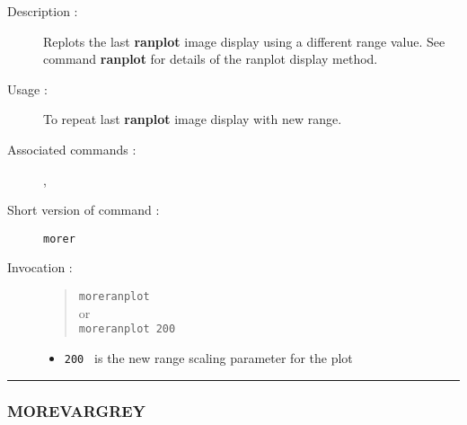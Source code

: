 \begin{description}

\item[Description :] Replots the last {\bf ranplot} image display using a
different range value.  See command {\bf ranplot} for details of the ranplot
display method.

\item[Usage :] To repeat last {\bf ranplot} image display with new range.
\item[Associated commands :] {\tt {}},
{\tt {}}
\item[Short version of command :] {\tt morer}
\item[Invocation :]

\begin{quote}{\tt  moreranplot }\\
or \\
{\tt moreranplot 200 }
\end{quote}

\begin{itemize}

\item {\tt 200 } is the new range scaling parameter for the plot
\end{itemize}

\end{description}

\hrule
\subsubsection*{\label{MOREVARGREY}MOREVARGREY}

